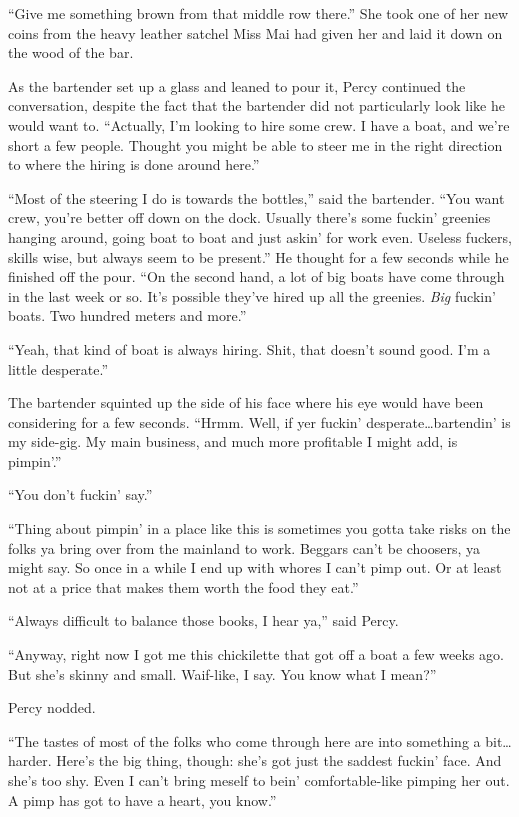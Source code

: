 \documentclass[
]{scrbook}
\begin{document}
``Give me something brown from that middle row there.'' She took one of
her new coins from the heavy leather satchel Miss Mai had given her and
laid it down on the wood of the bar.

As the bartender set up a glass and leaned to pour it, Percy continued
the conversation, despite the fact that the bartender did not
particularly look like he would want to. ``Actually, I'm looking to hire
some crew. I have a boat, and we're short a few people. Thought you
might be able to steer me in the right direction to where the hiring is
done around here.''

``Most of the steering I do is towards the bottles,'' said the
bartender. ``You want crew, you're better off down on the dock. Usually
there's some fuckin' greenies hanging around, going boat to boat and
just askin' for work even. Useless fuckers, skills wise, but always seem
to be present.'' He thought for a few seconds while he finished off the
pour. ``On the second hand, a lot of big boats have come through in the
last week or so. It's possible they've hired up all the greenies.
\emph{Big} fuckin' boats. Two hundred meters and more.''

``Yeah, that kind of boat is always hiring. Shit, that doesn't sound
good. I'm a little desperate.''

The bartender squinted up the side of his face where his eye would have
been considering for a few seconds. ``Hrmm. Well, if yer fuckin'
desperate\ldots bartendin' is my side-gig. My main business, and much
more profitable I might add, is pimpin'.''

``You don't fuckin' say.''

``Thing about pimpin' in a place like this is sometimes you gotta take
risks on the folks ya bring over from the mainland to work. Beggars
can't be choosers, ya might say. So once in a while I end up with whores
I can't pimp out. Or at least not at a price that makes them worth the
food they eat.''

``Always difficult to balance those books, I hear ya,'' said Percy.

``Anyway, right now I got me this chickilette that got off a boat a few
weeks ago. But she's skinny and small. Waif-like, I say. You know what I
mean?''

Percy nodded.

``The tastes of most of the folks who come through here are into
something a bit\ldots harder. Here's the big thing, though: she's got
just the saddest fuckin' face. And she's too shy. Even I can't bring
meself to bein' comfortable-like pimping her out. A pimp has got to have
a heart, you know.''
\end{document}
